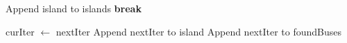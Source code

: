 \documentclass[12pt]{article}
\begin{document}
\begin{algorithm}
\begin{algorithmic}[1]
                    \EndFor
    
                        \State Append island to islands
                        \State \textbf{break}
                    \EndIf
    
                    \State curIter $\gets$ nextIter
                    \State Append nextIter to island
                    \State Append nextIter to foundBuses
    
                \EndWhile
            \EndIf
        \EndFor
    \EndFunction
    \end{algorithmic}
\end{algorithm}
\end{document}
